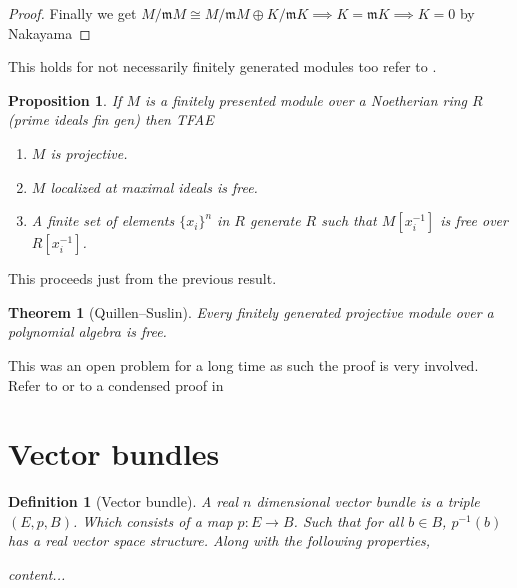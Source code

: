 \documentclass[12pt]{article}
\numberwithin{equation}{section}
\newtheorem{theorem}{Theorem}[section]
\newtheorem{definition}{Definition}[section]
\newtheorem{proposition}{Proposition}[section]
\begin{document}
\begin{appendices}
\begin{proof}
		Finally we get $M/\mathfrak{m}M \cong M/\mathfrak{m}M \oplus K/\mathfrak{m}K\implies K=\mathfrak{m}K \implies K=0$ by Nakayama
	\end{proof}
	This holds for not necessarily finitely generated modules too refer to \cite[Th.~2.5]{matsumura_1987}	.
	\begin{proposition} If $M$ is a finitely presented module over a Noetherian ring $R$ (prime ideals fin gen) then TFAE
		\begin{enumerate}
			\item $M$ is projective.
			\item $M$ localized at maximal ideals is free.
			\item A finite set of elements $\{x_i\}^n$ in $R$ generate $R$ such that $M[x_i^{-1}]$ is free over $R[x_i^{-1}]$.
		\end{enumerate}		
	\end{proposition}
	This proceeds just from the previous result.
	
	\begin{theorem}[Quillen–Suslin]
		Every finitely generated projective module over a polynomial algebra is free.
	\end{theorem}
	
	
	This was an open problem for a long time as such the proof is very involved. Refer to \cite{nlab:quillen-suslin_theorem} or to a condensed proof in \cite[p. ~848]{lang02}
	
	\section{Vector bundles}
	\begin{definition}[Vector bundle]
		A real $n$ dimensional vector bundle is a triple $(E,p, B)$. Which consists of a map $p:E \to B$. Such that for all $b \in B$, $p^{-1}(b)$ has a real vector space structure. Along with the following properties,
		\begin{enumerate}
			content...
		\end{enumerate}
	\end{definition}
	

\end{appendices}
\end{document}
